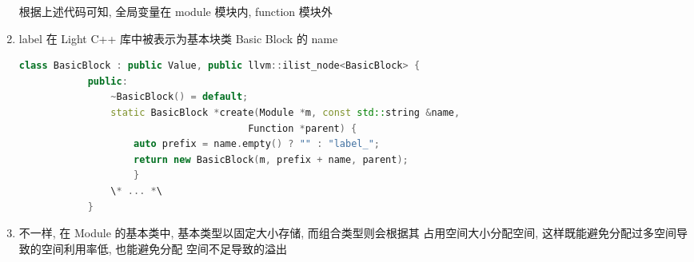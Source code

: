 \documentclass[UTF8]{ctexart}
\begin{document}
\begin{sloppypar}
\begin{enumerate}
        根据上述代码可知, 全局变量在 module 模块内, function 模块外
    \item label 在 Light C++ 库中被表示为基本块类 Basic Block 的 name
        \begin{lstlisting}[language=C++, title=BasicBlock.hpp]
            class BasicBlock : public Value, public llvm::ilist_node<BasicBlock> {
            public:
                ~BasicBlock() = default;
                static BasicBlock *create(Module *m, const std::string &name,
                                        Function *parent) {
                    auto prefix = name.empty() ? "" : "label_";
                    return new BasicBlock(m, prefix + name, parent);
                    }
                \* ... *\
            }
        \end{lstlisting}
    \item 不一样, 在 Module 的基本类中, 基本类型以固定大小存储, 而组合类型则会根据其
        占用空间大小分配空间, 这样既能避免分配过多空间导致的空间利用率低, 也能避免分配
        空间不足导致的溢出
\end{enumerate}

\end{sloppypar}
\end{document}

